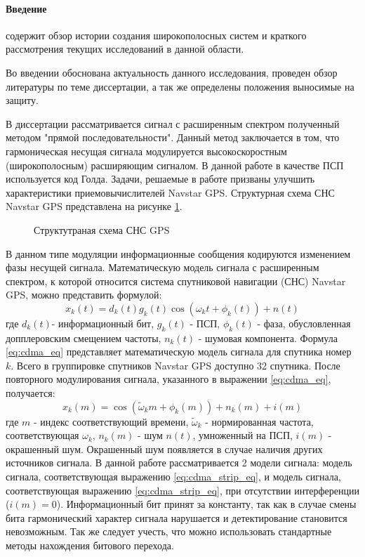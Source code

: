 \paragraph{Введение} содержит обзор истории создания широкополосных систем и краткого рассмотрения текущих исследований в данной области.

Во введении обоснована актуальность данного исследования, проведен обзор литературы по теме диссертации, а так же
определены положения выносимые на защиту.

В диссертации рассматривается сигнал с расширенным спектром полученный методом "прямой последовательности".
Данный метод заключается в том, что гармоническая несущая сигнала модулируется высокоскоростным (широкополосным)
расширяющим сигналом. В данной работе в качестве ПСП используется код Голда. Задачи, решаемые в работе призваны
улучшить характеристики приемовычислителей Navstar GPS. Структурная схема СНС Navstar GPS представлена на рисунке
\ref{pic:sec1_gnss_system}.

\begin{figure}[H]
	\center{}
	\caption{Структутраная схема СНС GPS}
	\label{pic:sec1_gnss_system}
\end{figure}

В данном типе модуляции информационные сообщения кодируются изменением фазы несущей сигнала.
Математическую модель сигнала с расширенным спектром, к которой относится система спутниковой навигации (СНС) Navstar GPS, можно представить формулой:
\begin{equation}
	\label{eq:cdma_eq}
	x_k(t)=d_k(t)g_k(t)\cos{(\omega_{k}t + \phi_k(t))} + n(t)
\end{equation}
где ${d_k}(t)$- информационный бит, ${g_k}(t)$ - ПСП, ${\phi_k(t)}$ - фаза, обусловленная допплеровским смещением частоты, 
${n_k(t)}$ - шумовая компонента. Формула  \ref{eq:cdma_eq} представляет математическую модель сигнала для спутника номер ${k}$.
Всего в группировке спутников Navstar GPS доступно 32 спутника. После повторного модулирования сигнала, указанного в выражении \ref{eq:cdma_eq},
получается:
\begin{equation}
	\label{eq:cdma_strip_eq}
	x_k(m)=\cos{(\tilde{\omega}_{k}m + \phi_k(m))} + n_k(m) + i(m)
\end{equation}
где ${m}$ - индекс соответствующий времени, ${\tilde{\omega}_k}$ - нормированная частота, соответствующая ${\omega_k}$, ${n_k}(m)$ - шум ${n(t)}$, умноженный на ПСП,
${i(m)}$ - окрашенный шум. Окрашенный шум появляется в случае наличия других источников сигнала.
В данной работе рассматривается 2 модели сигнала: модель сигнала, соответствующая выражению \ref{eq:cdma_strip_eq}, и модель сигнала,
соответствующая выражению \ref{eq:cdma_strip_eq}, при отсутствии интерференции (${i(m)=0}$).
Информационный бит принят за константу, так как в случае смены бита гармонический характер сигнала нарушается и детектирование становится невозможным.
Так же следует учесть, что можно использовать стандартные методы нахождения битового перехода.

